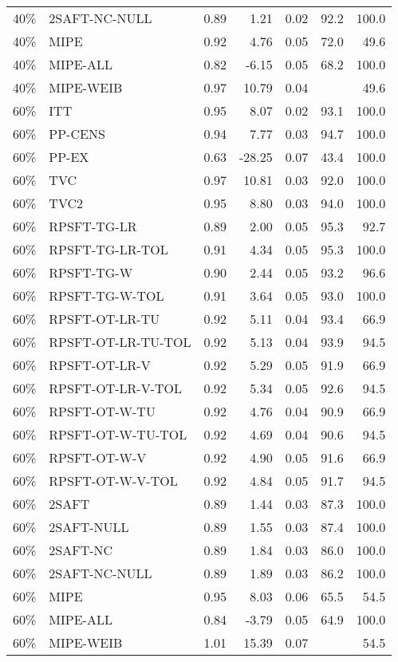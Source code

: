 \begin{table}[ht]
{\begin{tabular}{llrrrrr}
  40\% & 2SAFT-NC-NULL & 0.89 & 1.21 & 0.02 & 92.2 & 100.0 \\ 
  40\% & MIPE & 0.92 & 4.76 & 0.05 & 72.0 & 49.6 \\ 
  40\% & MIPE-ALL & 0.82 & -6.15 & 0.05 & 68.2 & 100.0 \\ 
  40\% & MIPE-WEIB & 0.97 & 10.79 & 0.04 &  & 49.6 \\ 
   \hline
60\% & ITT & 0.95 & 8.07 & 0.02 & 93.1 & 100.0 \\ 
  60\% & PP-CENS & 0.94 & 7.77 & 0.03 & 94.7 & 100.0 \\ 
  60\% & PP-EX & 0.63 & -28.25 & 0.07 & 43.4 & 100.0 \\ 
  60\% & TVC & 0.97 & 10.81 & 0.03 & 92.0 & 100.0 \\ 
  60\% & TVC2 & 0.95 & 8.80 & 0.03 & 94.0 & 100.0 \\ 
   \hline
60\% & RPSFT-TG-LR & 0.89 & 2.00 & 0.05 & 95.3 & 92.7 \\ 
  60\% & RPSFT-TG-LR-TOL & 0.91 & 4.34 & 0.05 & 95.3 & 100.0 \\ 
  60\% & RPSFT-TG-W & 0.90 & 2.44 & 0.05 & 93.2 & 96.6 \\ 
  60\% & RPSFT-TG-W-TOL & 0.91 & 3.64 & 0.05 & 93.0 & 100.0 \\ 
  60\% & RPSFT-OT-LR-TU & 0.92 & 5.11 & 0.04 & 93.4 & 66.9 \\ 
  60\% & RPSFT-OT-LR-TU-TOL & 0.92 & 5.13 & 0.04 & 93.9 & 94.5 \\ 
  60\% & RPSFT-OT-LR-V & 0.92 & 5.29 & 0.05 & 91.9 & 66.9 \\ 
  60\% & RPSFT-OT-LR-V-TOL & 0.92 & 5.34 & 0.05 & 92.6 & 94.5 \\ 
   \hline
60\% & RPSFT-OT-W-TU & 0.92 & 4.76 & 0.04 & 90.9 & 66.9 \\ 
  60\% & RPSFT-OT-W-TU-TOL & 0.92 & 4.69 & 0.04 & 90.6 & 94.5 \\ 
  60\% & RPSFT-OT-W-V & 0.92 & 4.90 & 0.05 & 91.6 & 66.9 \\ 
  60\% & RPSFT-OT-W-V-TOL & 0.92 & 4.84 & 0.05 & 91.7 & 94.5 \\ 
   \hline
60\% & 2SAFT & 0.89 & 1.44 & 0.03 & 87.3 & 100.0 \\ 
  60\% & 2SAFT-NULL & 0.89 & 1.55 & 0.03 & 87.4 & 100.0 \\ 
  60\% & 2SAFT-NC & 0.89 & 1.84 & 0.03 & 86.0 & 100.0 \\ 
  60\% & 2SAFT-NC-NULL & 0.89 & 1.89 & 0.03 & 86.2 & 100.0 \\ 
  60\% & MIPE & 0.95 & 8.03 & 0.06 & 65.5 & 54.5 \\ 
  60\% & MIPE-ALL & 0.84 & -3.79 & 0.05 & 64.9 & 100.0 \\ 
  60\% & MIPE-WEIB & 1.01 & 15.39 & 0.07 &  & 54.5 \\ 
   \hline
\end{tabular}
}
\end{table}
